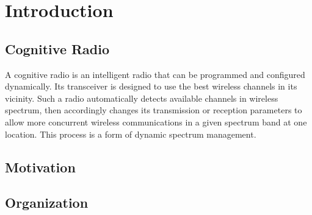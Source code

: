 \chapter{Introduction}
\section{Cognitive Radio}
A cognitive radio is an intelligent radio that can be programmed and configured dynamically. Its transceiver is designed to use the best wireless channels in its vicinity. Such a radio automatically detects available channels in wireless spectrum, then accordingly changes its transmission or reception parameters to allow more concurrent wireless communications in a given spectrum band at one location. This process is a form of dynamic spectrum management.\cite{wikiCR}

\section{Motivation}
\section{Organization}